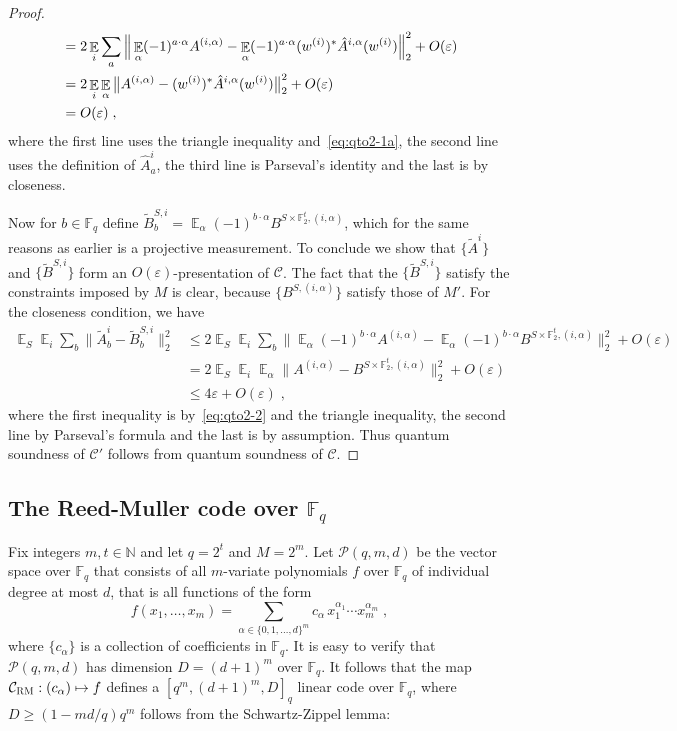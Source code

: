 \documentclass[11pt]{article}
\theoremstyle{definition}
\newcommand{\code}{\mathcal{C}}
\DeclareMathOperator*{\Expectation}{\mathbb{E}}
\newcommand{\Es}[1]{\Expectation_{#1}}
\newcommand{\N}{\ensuremath{\mathbb{N}}}
\newcommand{\F}{\ensuremath{\mathbb{F}}}
\newcommand{\mC}{\ensuremath{\mathcal{C}}}
\newcommand{\mP}{\ensuremath{\mathcal{P}}}
\newcommand{\RM}{\ensuremath{\textsc{RM}}}
\newcommand{\eps}{\varepsilon}
\begin{document}
\begin{proof}
\begin{align}
&=  2\Es{i} \sum_a \Big\| \Es{\alpha} (-1)^{a\cdot \alpha} A^{(i,\alpha)} -   \Es{\alpha} (-1)^{a\cdot \alpha} (w^{(i)})^* \hat{A}^{i,\alpha} (w^{(i)}) \Big\|_2^2+ O(\eps) \notag\\
&= 2\Es{i} \Es{\alpha} \big\| A^{(i,\alpha)} -    (w^{(i)})^* \hat{A}^{i,\alpha} (w^{(i)}) \big\|_2^2+ O(\eps)\notag\\
&= O(\eps)\;, \label{eq:qto2-2}
\end{align}
where the first line uses the triangle inequality and~\eqref{eq:qto2-1a}, the second line uses the definition of $\hat{A}^i_a$, the third line is Parseval's identity and the last is by closeness. 

Now for $b\in \F_q$ define $\tilde{B}^{S,i}_b= \Es{\alpha} (-1)^{b\cdot \alpha} B^{S\times \F_2^t,(i,\alpha)}$, which for the same reasons as earlier is a projective measurement. 
To conclude we show that $\{\tilde{A}^{i}\}$ and $\{\tilde{B}^{S,i}\}$ form an $O(\eps)$-presentation of $\code$. The fact that the $\{\tilde{B}^{S,i}\}$ satisfy the constraints imposed by $M$ is clear, because $\{B^{S,(i,\alpha)}\}$ satisfy those of $M'$. For the closeness condition, we have
\begin{align*}
\Es{S}\Es{i} \sum_b \big\| \tilde{A}^i_b - \tilde{B}^{S,i}_b \big\|_2^2
&\leq 2\Es{S}\Es{i} \sum_b \Big\| \Es{\alpha} (-1)^{b\cdot \alpha} {A}^{(i,\alpha)} - \Es{\alpha} (-1)^{b\cdot \alpha} B^{S\times \F_2^t,(i,\alpha)}\Big\|_2^2 + O(\eps)\\
&= 2\Es{S}\Es{i} \Es{\alpha}\big\|  {A}^{(i,\alpha)} -  B^{S\times \F_2^t,(i,\alpha)}\big\|_2^2 + O(\eps)\\
&\leq 4\eps + O(\eps)\;,
\end{align*}
where the first inequality is by~\eqref{eq:qto2-2} and the triangle inequality, the second line by Parseval's formula and the last is by assumption. Thus quantum soundness of $\code'$ follows from quantum soundness of $\code$. 
\end{proof}






\subsection{The Reed-Muller code over $\F_q$}

Fix integers $m,t \in \N$ and let $q=2^t$ and $M = 2^m$. Let $\mP(q,m,d)$ be the vector space over $\F_q$ that consists of all $m$-variate polynomials $f$ over $\F_q$ of individual degree at most $d$, that is all functions of the form
\[
	f(x_1,\ldots,x_m) = \sum_{\alpha \in \{0,1,\ldots,d\}^m} c_\alpha\,
  x_1^{\alpha_1} \cdots x_m^{\alpha_m}\;,
\]
where $\{c_\alpha\}$ is a collection of coefficients in $\F_q$. It is easy to verify that $\mP(q,m,d)$ has dimension $D = (d+1)^m$ over $\F_q$. It follows that the map $\mC_\RM: (c_\alpha) \mapsto f$ defines a $[q^m,(d+1)^m,D]_q$ linear code over $\F_q$, where $D\geq (1-md/q)q^m$ follows from the Schwartz-Zippel lemma: 
\end{document}

